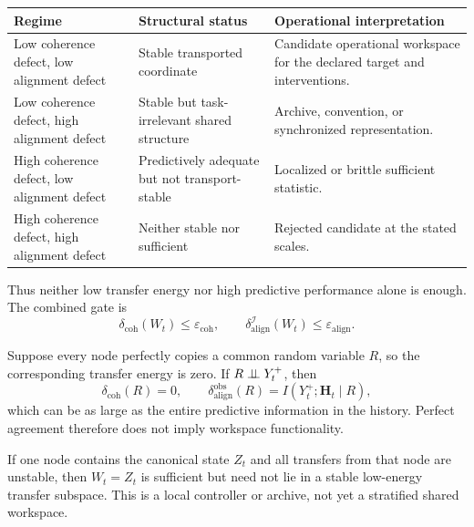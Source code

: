 \begin{center}
\small
\begin{tabularx}{\textwidth}{@{}>{\raggedright\arraybackslash}p{}>{\raggedright\arraybackslash}p{}>{\raggedright\arraybackslash}X@{}}
\toprule
Regime & Structural status & Operational interpretation \\
\midrule
Low coherence defect, low alignment defect & Stable transported coordinate &
Candidate operational workspace for the declared target and interventions. \\
Low coherence defect, high alignment defect & Stable but task-irrelevant
shared structure & Archive, convention, or synchronized representation. \\
High coherence defect, low alignment defect & Predictively adequate but not
transport-stable & Localized or brittle sufficient statistic. \\
High coherence defect, high alignment defect & Neither stable nor sufficient &
Rejected candidate at the stated scales. \\
\bottomrule
\end{tabularx}
\end{center}

Thus neither low transfer energy nor high predictive performance alone is
enough. The combined gate is
\[
\boxed{
\delta_{\mathrm{coh}}(W_t)
\leq
\varepsilon_{\mathrm{coh}},
\qquad
\delta_{\mathrm{align}}^{\mathcal I}(W_t)
\leq
\varepsilon_{\mathrm{align}}.
}
\]

\begin{example}
Suppose every node perfectly copies a common random variable \(R\), so the
corresponding transfer energy is zero. If \(R\perp\!\!\!\perp Y_t^+\), then
\[
\delta_{\mathrm{coh}}(R)=0,
\qquad
\delta_{\mathrm{align}}^{\mathrm{obs}}(R)
=I(Y_t^+;\mathbf H_t\mid R),
\]
which can be as large as the entire predictive information in the history.
Perfect agreement therefore does not imply workspace functionality.
\end{example}

\begin{example}
If one node contains the canonical state \(Z_t\) and all transfers from that
node are unstable, then \(W_t=Z_t\) is sufficient but need not lie in a stable
low-energy transfer subspace. This is a local controller or archive, not yet a
stratified shared workspace.
\end{example}
